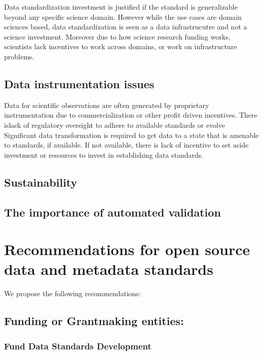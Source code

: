 \documentclass[
  letterpaper,
  DIV=11,
  numbers=noendperiod]{scrartcl}
\begin{document}
Data standardization investment is justified if the standard is
generalizable beyond any specific science domain. However while the use
cases are domain sciences based, data standardization is seen as a data
infrastrucutre and not a science investment. Moreover due to how science
research funding works, scientists lack incentives to work across
domains, or work on infrastructure problems.

\subsection{Data instrumentation
issues}\label{data-instrumentation-issues}

Data for scientific observations are often generated by proprietary
instrumentation due to commercialization or other profit driven
incentives. There islack of regulatory oversight to adhere to available
standards or evolve Significant data transformation is required to get
data to a state that is amenable to standards, if available. If not
available, there is lack of incentive to set aside investment or
resources to invest in establishing data standards.

\subsection{Sustainability}\label{sustainability}

\subsection{The importance of automated
validation}\label{the-importance-of-automated-validation}

\section{Recommendations for open source data and metadata
standards}\label{recommendations-for-open-source-data-and-metadata-standards}

We propose the following recommendations:

\subsection{Funding or Grantmaking
entities:}\label{funding-or-grantmaking-entities}

\subsubsection{Fund Data Standards
Development}\label{fund-data-standards-development}
\end{document}
